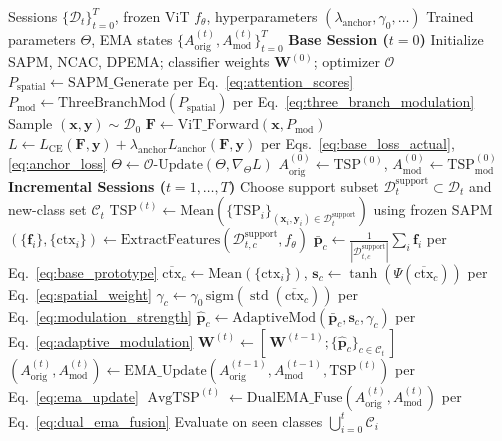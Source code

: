 ﻿\documentclass[letterpaper,journal]{IEEEtran}
\newcommand{\sigmafunc}{\mathrm{sigm}}
\begin{document}
\begin{algorithm}[!t]
\caption{TerraSAP FSCIL Training Pipeline}
\label{alg:terrasap_fscil}
\begin{algorithmic}[1]
\REQUIRE Sessions $\{\mathcal{D}_t\}_{t=0}^{T}$, frozen ViT $f_{\theta}$, hyperparameters $(\lambda_{\mathrm{anchor}}, \gamma_0, \ldots)$
\ENSURE Trained parameters $\Theta$, EMA states $\{A^{(t)}_{\mathrm{orig}}, A^{(t)}_{\mathrm{mod}}\}_{t=0}^{T}$
\STATE \textbf{Base Session ($t=0$)}
\STATE Initialize SAPM, NCAC, DPEMA; classifier weights $\mathbf{W}^{(0)}$; optimizer $\mathcal{O}$
\STATE $P_{\mathrm{spatial}} \gets \mathrm{SAPM\_Generate}$ per Eq.~\eqref{eq:attention_scores}
\STATE $P_{\mathrm{mod}} \gets \mathrm{ThreeBranchMod}(P_{\mathrm{spatial}})$ per Eq.~\eqref{eq:three_branch_modulation}
\REPEAT
    \STATE Sample $(\mathbf{x},\mathbf{y}) \sim \mathcal{D}_0$
    \STATE $\mathbf{F} \gets \mathrm{ViT\_Forward}(\mathbf{x}, P_{\mathrm{mod}})$
    \STATE $L \gets L_{\mathrm{CE}}(\mathbf{F},\mathbf{y}) + \lambda_{\mathrm{anchor}} L_{\mathrm{anchor}}(\mathbf{F},\mathbf{y})$ per Eqs.~\eqref{eq:base_loss_actual}, \eqref{eq:anchor_loss}
    \STATE $\Theta \gets \mathcal{O}\text{-Update}(\Theta, \nabla_{\Theta} L)$
\STATE $A_{\mathrm{orig}}^{(0)} \gets \mathrm{TSP}^{(0)}$, $A_{\mathrm{mod}}^{(0)} \gets \mathrm{TSP}_{\mathrm{mod}}^{(0)}$
\STATE \textbf{Incremental Sessions ($t=1,\dots,T$)}
    \STATE Choose support subset $\mathcal{D}_t^{\mathrm{support}} \subset \mathcal{D}_t$ and new-class set $\mathcal{C}_t$
    \STATE $\text{TSP}^{(t)} \gets \mathrm{Mean}(\{\text{TSP}_i\}_{(\mathbf{x}_i,\mathbf{y}_i)\in\mathcal{D}_t^{\mathrm{support}}})$ using frozen SAPM
        \STATE $(\{\mathbf{f}_i\}, \{\mathrm{ctx}_i\}) \gets \mathrm{ExtractFeatures}(\mathcal{D}_{t,c}^{\mathrm{support}}, f_{\theta})$
        \STATE $\bar{\mathbf{p}}_c \gets \frac{1}{|\mathcal{D}_{t,c}^{\mathrm{support}}|}\sum_i \mathbf{f}_i$ per Eq.~\eqref{eq:base_prototype}
        \STATE $\overline{\mathrm{ctx}}_c \gets \mathrm{Mean}(\{\mathrm{ctx}_i\})$, $\mathbf{s}_c \gets \tanh(\Psi(\overline{\mathrm{ctx}}_c))$ per Eq.~\eqref{eq:spatial_weight}
        \STATE $\gamma_c \gets \gamma_0\,\sigmafunc(\operatorname{std}(\overline{\mathrm{ctx}}_c))$ per Eq.~\eqref{eq:modulation_strength}
        \STATE $\hat{\mathbf{p}}_c \gets \mathrm{AdaptiveMod}(\bar{\mathbf{p}}_c, \mathbf{s}_c, \gamma_c)$ per Eq.~\eqref{eq:adaptive_modulation}
    \ENDFOR
    \STATE $\mathbf{W}^{(t)} \gets [\,\mathbf{W}^{(t-1)};\{\hat{\mathbf{p}}_c\}_{c\in\mathcal{C}_t}\,]$
    \STATE $(A_{\mathrm{orig}}^{(t)}, A_{\mathrm{mod}}^{(t)}) \gets \mathrm{EMA\_Update}(A_{\mathrm{orig}}^{(t-1)}, A_{\mathrm{mod}}^{(t-1)}, \text{TSP}^{(t)})$ per Eq.~\eqref{eq:ema_update}
    \STATE $\operatorname{AvgTSP}^{(t)} \gets \mathrm{DualEMA\_Fuse}(A_{\mathrm{orig}}^{(t)}, A_{\mathrm{mod}}^{(t)})$ per Eq.~\eqref{eq:dual_ema_fusion}
    \STATE Evaluate on seen classes $\bigcup_{i=0}^{t} \mathcal{C}_i$
\ENDFOR
\end{algorithmic}
\end{algorithm}
\end{document}
